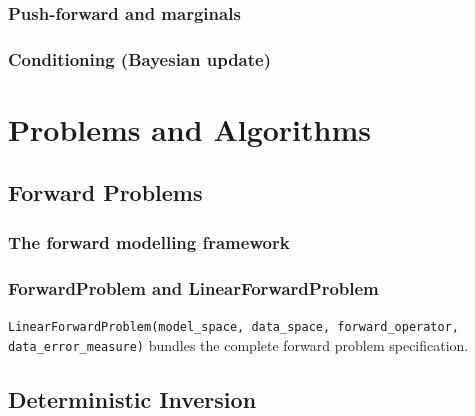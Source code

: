 \documentclass[11pt,twoside,openright]{book}
\theoremstyle{plain}
\theoremstyle{definition}
\theoremstyle{remark}
\begin{document}
\section{Push-forward and marginals}
\label{sec:push-forward}

\section{Conditioning (Bayesian update)}
\label{sec:gaussian-conditioning}


\part{Problems and Algorithms}
\label{part:algorithms}

\chapter{Forward Problems}
\label{ch:forward-problems}

\section{The forward modelling framework}
\label{sec:forward-framework}

\section{ForwardProblem and LinearForwardProblem}
\label{sec:forward-classes}

\begin{codebox}
\texttt{LinearForwardProblem(model\_space, data\_space, forward\_operator,
data\_error\_measure)} bundles the complete forward problem specification.
\end{codebox}


\chapter{Deterministic Inversion}
\label{ch:deterministic-inversion}
\end{document}
